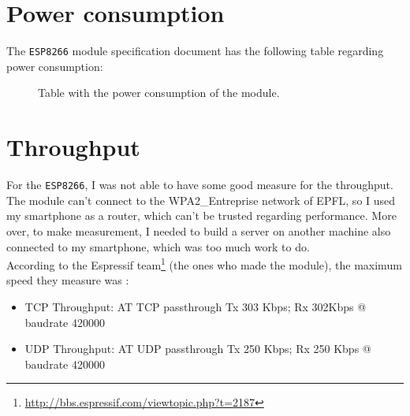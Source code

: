 \documentclass[11pt]{article}
\begin{document}
\section{Power consumption}
The \texttt{ESP8266} module specification document has the following table regarding power consumption:
\begin{figure}[H]
    \caption{Table with the power consumption of the module.}
\end{figure}
\section{Throughput}
For the \texttt{ESP8266}, I was not able to have some good measure for the throughput. The module can't connect to the WPA2\_Entreprise network of EPFL, so I used my smartphone as a router, which can't be trusted regarding performance. More over, to make measurement, I needed to build a server on another machine also connected to my smartphone, which was too much work to do.\\
According to the Espressif team\footnote{\url{http://bbs.espressif.com/viewtopic.php?t=2187}} (the ones who made the module), the maximum speed they measure was :
\begin{itemize}
\item TCP Throughput: AT TCP passthrough Tx 303 Kbps; Rx 302Kbps @ baudrate 420000
\item UDP Throughput: AT UDP passthrough Tx 250 Kbps; Rx 250 Kbps @ baudrate 420000
\end{itemize}
\pagebreak
\end{document}
